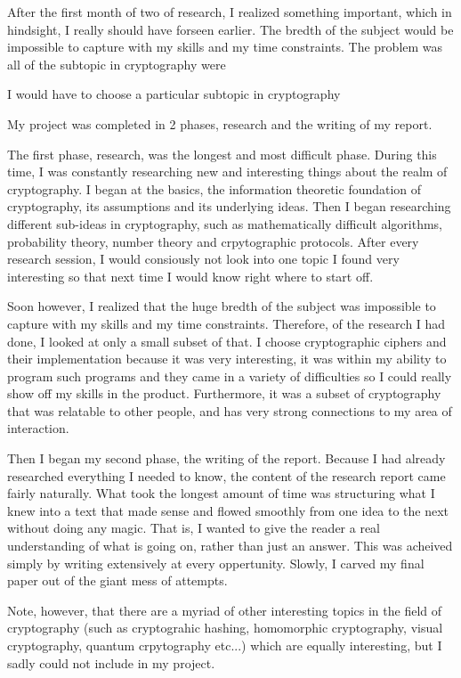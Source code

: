 \documentclass[12pt, a4paper, draft]{report}
\begin{document}
After the first month of two of research, I realized something important,
which in hindsight, I really should have forseen earlier. The bredth of
the subject would be impossible to capture with my skills and my time
constraints. The problem was all of the subtopic in cryptography were

I would have to choose a particular subtopic in cryptography

My project was completed in 2 phases, research and the writing of my report.

The first phase, research, was the longest and most difficult phase. During
this time, I was constantly researching new and interesting things about
the realm of cryptography. I began at the basics, the information theoretic
foundation of cryptography, its assumptions and its underlying ideas. Then
I began researching different sub-ideas in cryptography, such as
mathematically difficult algorithms, probability theory, number theory
and crpytographic protocols. After every research session, I would consiously
not look into one topic I found very interesting so that next time I would
know right where to start off.

Soon however, I realized that the huge bredth of the subject was impossible
to capture with my skills and my time constraints. Therefore, of the research
I had done, I looked at only a small subset of that. I choose cryptographic
ciphers and their implementation because it was very interesting, it was
within my ability to program such programs and they came in a variety of
difficulties so I could really show off my skills in the product.
Furthermore, it was a subset of cryptography that was relatable to other
people, and has very strong connections to my area of interaction.

Then I began my second phase, the writing of the report. Because I had
already researched everything I needed to know, the content of the research
report came fairly naturally. What took the longest amount of time was
structuring what I knew into a text that made sense and flowed smoothly
from one idea to the next without doing any magic. That is, I wanted to
give the reader a real understanding of what is going on, rather than
just an answer. This was acheived simply by writing extensively
at every oppertunity. Slowly, I carved my final paper out of the giant
mess of attempts.

Note, however, that there are a myriad of other interesting topics in
the field of cryptography (such as cryptograhic hashing, homomorphic
cryptography, visual cryptography, quantum crpytography etc...) which
are equally interesting, but I sadly could not include in my project.
\end{document}
